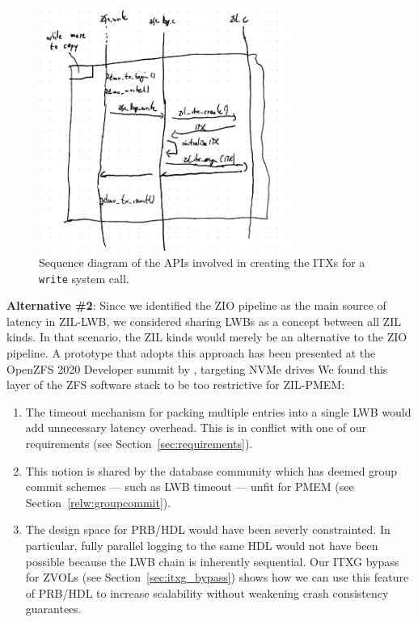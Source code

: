 \documentclass[12pt,a4paper,twoside]{book}
\begin{document}
\begin{figure}[H]
    \centering
    \includegraphics[height=8cm]{fig/zfs_log_write_sequence_diagram}
    \caption{Sequence diagram of the APIs involved in creating the ITXs for a \lstinline{write} system call.}
    \label{fig:zfs_log_write_sequence_diagram}
\end{figure}

\textbf{Alternative \#2}: Since we identified the ZIO pipeline as the main source of latency in ZIL-LWB, we considered sharing LWBs as a concept between all ZIL kinds.
In that scenario, the ZIL kinds would merely be an alternative to the ZIO pipeline.
A prototype that adopts this approach has been presented at the OpenZFS 2020 Developer summit by \citeauthor{openzfsZILPerformanceImprovements2020}, targeting NVMe drives \cite{openzfsZILPerformanceImprovements2020}
We found this layer of the ZFS software stack to be too restrictive for ZIL-PMEM:
\begin{enumerate}[noitemsep]
    \item The timeout mechanism for packing multiple entries into a single LWB would add unnecessary latency overhead.
        This is in conflict with one of our requirements (see Section~\ref{sec:requirements}).
    \item This notion is shared by the database community which has deemed group commit schemes --- such as LWB timeout --- unfit for PMEM (see Section~\ref{relw:groupcommit}).
    \item The design space for PRB/HDL would have been severly constrainted.
        In particular, fully parallel logging to the same HDL would not have been possible because the LWB chain is inherently sequential.
        Our ITXG bypass for ZVOLs (see Section~\ref{sec:itxg_bypass}) shows how we can use this feature of PRB/HDL to increase scalability without weakening crash consistency guarantees.
\end{enumerate}
\end{document}
